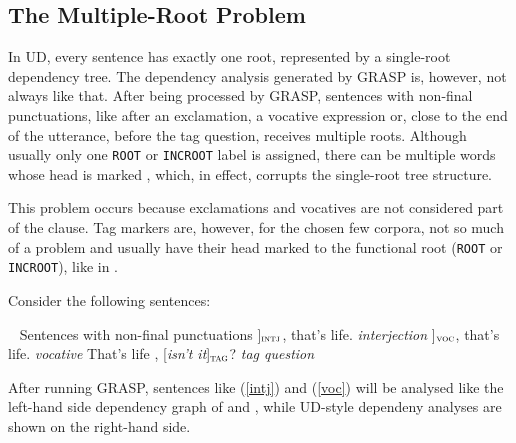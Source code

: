 \subsection{The Multiple-Root Problem}

In UD, every sentence has exactly one root, represented by a single-root dependency tree. The dependency analysis generated by GRASP is, however, not always like that. After being processed by GRASP, sentences with non-final punctuations, like after an exclamation, a vocative expression or, close to the end of the utterance, before the tag question, receives multiple roots. Although usually only one \texttt{ROOT} or \texttt{INCROOT} label is assigned, there can be multiple words whose head is marked , which, in effect, corrupts the single-root tree structure.

This problem occurs because exclamations and vocatives are not considered part of the clause. Tag markers are, however, for the chosen few corpora, not so much of a problem and usually have their head marked to the functional root (\texttt{ROOT} or \texttt{INCROOT}), like in .

Consider the following sentences:

\pex~ Sentences with non-final punctuations\label{roots}
\a {[\sl Well\/}]$_{\text{\sc intj}}$, that's life.        \hfill {\sl interjection}\label{intj}
\a {[\sl  Son\/}]$_{\text{\sc voc}}$, that's life.         \hfill {\sl vocative}\label{voc}
\a That's life , {[\sl isn't it}]$_{\text{\sc tag}}$?    \hfill {\sl tag question}\label{tagq}
\xe


After running GRASP, sentences like (\ref{intj}) and (\ref{voc}) will be analysed like the left-hand side dependency graph of  and , while UD-style dependeny analyses are shown on the right-hand side.\\

